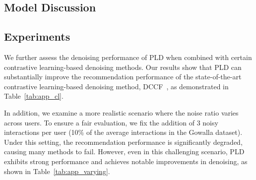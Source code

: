 \subsection{Model Discussion}
\label{sec:dis}






\subsection{Experiments}
\label{sec:app_exp}

We further assess the denoising performance of PLD when combined with certain contrastive learning-based denoising methods. Our results show that PLD can substantially improve the recommendation performance of the state-of-the-art contrastive learning-based denoising method, DCCF~\cite{ren2023disentangled}, as demonstrated in Table~\ref{tab:app_cl}.

In addition, we examine a more realistic scenario where the noise ratio varies across users. To ensure a fair evaluation, we fix the addition of 3 noisy interactions per user (10\% of the average interactions in the Gowalla dataset). Under this setting, the recommendation performance is significantly degraded, causing many methods to fail. However, even in this challenging scenario, PLD exhibits strong performance and achieves notable improvements in denoising, as shown in Table~\ref{tab:app_varying}.




